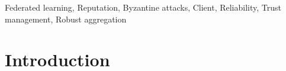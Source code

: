 \documentclass[lettersize,journal]{IEEEtran}
\begin{document}

\begin{IEEEkeywords}
Federated learning, Reputation, Byzantine attacks, Client, Reliability, Trust management, Robust aggregation
\end{IEEEkeywords}

\section{Introduction}
\end{document}

